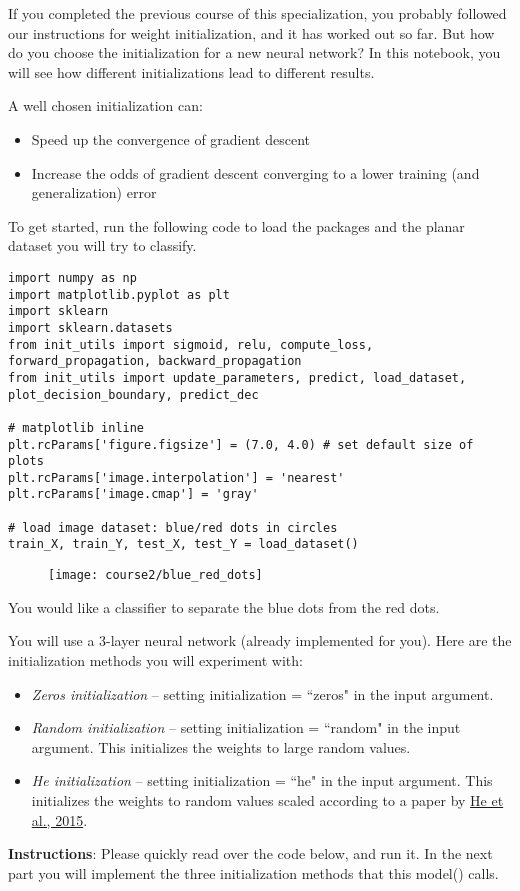If you completed the previous course of this specialization, you probably followed our instructions for weight initialization, and it has worked out so far. But how do you choose the initialization for a new neural network? In this notebook, you will see how different initializations lead to different results.

A well chosen initialization can:
\begin{itemize}
\item Speed up the convergence of gradient descent
\item Increase the odds of gradient descent converging to a lower training (and generalization) error
\end{itemize}


To get started, run the following code to load the packages and the planar dataset you will try to classify.
\begin{verbatim}
import numpy as np
import matplotlib.pyplot as plt
import sklearn
import sklearn.datasets
from init_utils import sigmoid, relu, compute_loss, forward_propagation, backward_propagation
from init_utils import update_parameters, predict, load_dataset, plot_decision_boundary, predict_dec

# matplotlib inline
plt.rcParams['figure.figsize'] = (7.0, 4.0) # set default size of plots
plt.rcParams['image.interpolation'] = 'nearest'
plt.rcParams['image.cmap'] = 'gray'

# load image dataset: blue/red dots in circles
train_X, train_Y, test_X, test_Y = load_dataset()
\end{verbatim}
\begin{figure}[h]
\begin{center}
\texttt{[image: course2/blue\_red\_dots]}
\end{center}
\end{figure}

You would like a classifier to separate the blue dots from the red dots.



You will use a 3-layer neural network (already implemented for you). Here are the initialization methods you will experiment with:
\begin{itemize}
\item \emph{Zeros initialization} -- setting initialization = ``zeros" in the input argument.
\item \emph{Random initialization} -- setting initialization = ``random" in the input argument. This initializes the weights to large random values.
\item \emph{He initialization} -- setting initialization = ``he" in the input argument. This initializes the weights to random values scaled according to a paper by \href{https://arxiv.org/abs/1512.03385}{He et al., 2015}.
\end{itemize}
{\textbf {Instructions}}: Please quickly read over the code below, and run it. In the next part you will implement the three initialization methods that this model() calls.

